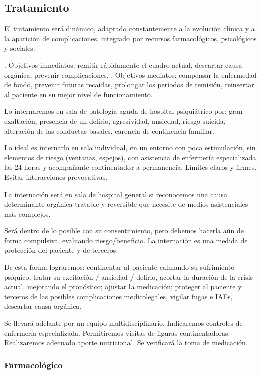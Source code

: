 \subsection*{Tratamiento}
El tratamiento será dinámico, adaptado constantemente a la evolución clínica y a la aparición de complicaciones, integrado por recursos farmacológicos, psicológicos y sociales\cite{yatham2018canadian}.

. Objetivos inmediatos: remitir rápidamente el cuadro actual, descartar causa orgánica, prevenir complicaciones.
. Objetivos mediatos: compensar la enfermedad de fondo, prevenir futuras recaídas, prolongar los períodos de remisión, reinsertar al paciente en su mejor nivel de funcionamiento.

Lo internaremos en sala de patología aguda de hospital psiquiátrico por: gran exaltación, presencia de un delirio, agresividad, ansiedad, riesgo suicida, alteración de las conductas basales, carencia de continencia familiar.

Lo ideal es internarlo en sala individual, en un entorno con poca estimulación, sin elementos de riesgo (ventanas, espejos), con asistencia de enfermería especializada las 24 horas y acompañante continentador a permanencia. Límites claros y firmes. Evitar interacciones provocativas.

La internación será en sala de hospital general si reconocemos una causa determinante orgánica tratable y reversible que necesite de medios asistenciales más complejos. 

Será dentro de lo posible con su consentimiento, pero debemos hacerla aún de forma compulsiva, evaluando riesgo/beneficio. La internación es una medida de protección del paciente y de terceros.

De esta forma lograremos: continentar al paciente calmando su sufrimiento psíquico, tratar su excitación / ansiedad / delirio, acortar la duración de la crisis actual, mejorando el pronóstico; ajustar la medicación; proteger al paciente y terceros de las posibles complicaciones medicolegales, vigilar fugas e IAEs, descartar causa orgánica.

Se llevará adelante por un equipo multidisciplinario. Indicaremos controles de enfermería especializada. Permitiremos visitas de figuras continentadoras. Realizaremos adecuado aporte nutricional. Se verificará la toma de medicación.
\subsubsection*{Farmacológico}
